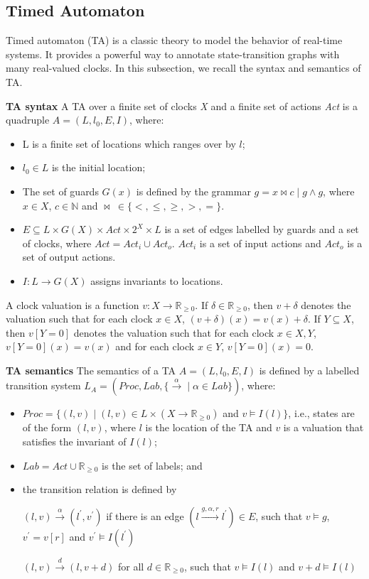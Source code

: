 \subsection{Timed Automaton}
Timed automaton (TA) \cite{BehrmannDLHPYH06} is a classic theory to model the behavior of real-time systems. It provides a powerful way to annotate state-transition graphs with many real-valued clocks. In this subsection, we recall the syntax and semantics of TA. 
\begin{definition}
\textbf{TA syntax}
A TA over a finite set of clocks \emph{X} and a finite set of actions \emph{Act} is a quadruple $\textit{A}=(L,l_{0},E,I)$, where:
\end{definition}
\begin{itemize}
\item
L is a finite set of locations which ranges over by $l$;
\item
$l_{0} \in  L$ is the initial location;
\item
The set of guards $G(x)$ is defined by the grammar $g = x \bowtie c \mid g \land g$, where $x \in X$, $c \in \mathbb{N}$ and $\bowtie~\in \{<,\leqslant,\geqslant,>,=\}$. 
\item
$E \subseteq L \times G(X) \times Act \times 2^X \times L$ is a set of edges labelled by guards and a set of clocks, where $Act = Act_{i} \cup Act_{o}$. $Act_{i}$ is a set of input actions and $Act_{o}$ is a set of output actions.
\item
$I : L \rightarrow G(X)$ assigns invariants to locations.
\end{itemize}
A clock valuation is a function $v : X \rightarrow \mathbb{R}_{\geqslant{0}}$. If $\delta \in \mathbb{R}_{\geqslant{0}}$, then $v + \delta$ denotes the valuation such that for each clock $x \in X$, $(v + \delta)(x) = v(x) + \delta$. If $Y \subseteq X$, then $v[Y = 0]$ denotes the valuation such that for each clock $x \in X, Y$, $v[Y = 0](x) = v(x)$ and for each clock $x \in Y$, $v[Y = 0](x) = 0$.
\begin{definition}
\textbf{TA semantics} 
The semantics of a TA $\textit{A}=(L,l_{0},E,I)$ is defined by a labelled transition system $L_{\textit{A}} = (Proc,Lab,\lbrace {{\xrightarrow{\alpha}}} \mid \alpha \in Lab \rbrace)$, where:
\end{definition}
\begin{itemize}
\item 
$Proc = \lbrace(l,v) \mid (l,v) \in L \times (X \rightarrow \mathbb{R}_{\geqslant{0}})$ and $v \models I(l) \rbrace$, i.e., states are of the form $(l,v)$, where $l$ is the location of the TA and $v$ is a valuation that satisfies the invariant of $I(l)$;
\item
$Lab = Act \cup \mathbb{R}_{\geqslant{0}}$ is the set of labels; and 
\item
the transition relation is defined by 

$(l,v) \xrightarrow{\alpha} (l^{\prime},v^{\prime})$ if there is an edge $(l \xrightarrow{g,\alpha,r} l^{\prime}) \in E$, such that $v \models g$, $v^{\prime} = v[r]$ and $v^{\prime} \models I(l^{\prime})$

$(l,v) \xrightarrow{d} (l,v+d)$ for all $d \in  \mathbb{R}_{\geqslant{0}}$, such that $v \models I(l)$ and $v + d \models I(l)$
\end{itemize}

